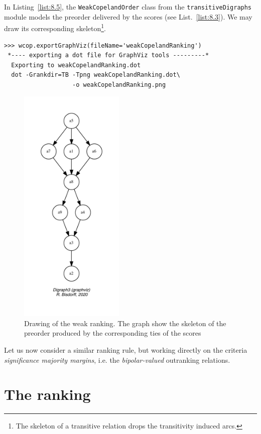 In Listing~\vref{list:8.5}, the \texttt{WeakCopelandOrder} class from the \texttt{transitiveDigraphs} module models the preorder delivered by the \Copeland scores (see List.~\vref{list:8.3}). We may draw its corresponding skeleton\footnote{The skeleton of a transitive relation drops the transitivity induced arcs.}.
\begin{lstlisting}
>>> wcop.exportGraphViz(fileName='weakCopelandRanking')
 *---- exporting a dot file for GraphViz tools ---------*
  Exporting to weakCopelandRanking.dot
  dot -Grankdir=TB -Tpng weakCopelandRanking.dot\
                   -o weakCopelandRanking.png
\end{lstlisting}
\begin{figure}[ht]
\sidecaption[t]
\includegraphics[width=5cm]{Figures/8-2-weakCopelandRanking.pdf}
\caption{Drawing of the weak \Copeland ranking. The graph show the skeleton of the preorder produced by the corresponding ties of the \Copeland scores}
\label{fig:8.2}       %
\end{figure}

Let us now consider a similar ranking rule, but working directly on the criteria \emph{significance majority margins}, i.e. the \emph{bipolar-valued} outranking relations.

\section{The \NetFlows ranking}
\label{sec:8.3}

